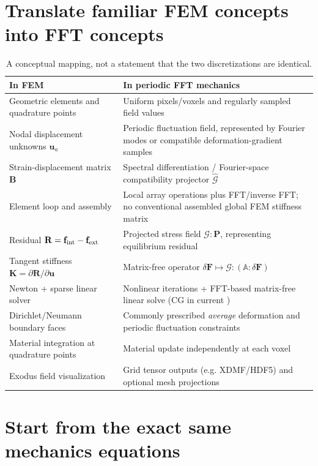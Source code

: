 \documentclass[11pt,a4paper]{article}
\newcommand{\code}[1]{\texttt{\detokenize{#1}}}
\begin{document}
\section{Translate familiar FEM concepts into FFT concepts}
\begin{table}[H]\centering\small
\begin{tabularx}{\textwidth}{@{}p{}X@{}}\toprule
\textbf{In FEM} & \textbf{In periodic FFT mechanics}\\\midrule
Geometric elements and quadrature points & Uniform pixels/voxels and regularly sampled field values\\
Nodal displacement unknowns $\mathbf u_a$ & Periodic fluctuation field, represented by Fourier modes or compatible deformation-gradient samples\\
Strain-displacement matrix $\mathbf B$ & Spectral differentiation / Fourier-space compatibility projector $\widehat{\mathcal G}$\\
Element loop and assembly & Local array operations plus FFT/inverse FFT; no conventional assembled global FEM stiffness matrix\\
Residual $\mathbf R=\mathbf f_{\rm int}-\mathbf f_{\rm ext}$ & Projected stress field $\mathcal G:\mathbf P$, representing equilibrium residual\\
Tangent stiffness $\mathbf K=\partial\mathbf R/\partial\mathbf u$ & Matrix-free operator $\delta\mathbf F\mapsto \mathcal G:(\mathbb A:\delta\mathbf F)$\\
Newton + sparse linear solver & Nonlinear iterations + FFT-based matrix-free linear solve (CG in current \code{FFTMechanics})\\
Dirichlet/Neumann boundary faces & Commonly prescribed \emph{average} deformation and periodic fluctuation constraints\\
Material integration at quadrature points & Material update independently at each voxel\\
Exodus field visualization & Grid tensor outputs (e.g. XDMF/HDF5) and optional mesh projections\\\bottomrule
\end{tabularx}
\caption{A conceptual mapping, not a statement that the two discretizations are identical.}
\end{table}

\section{Start from the exact same mechanics equations}
\end{document}
